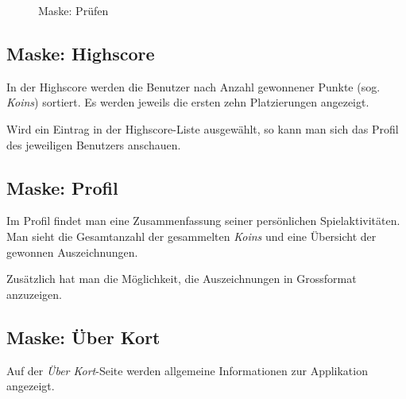 \begin{figure}[H]
\hfill
{}
\caption{Maske: Prüfen}
\end{figure}

\subsection{Maske: Highscore}
In der Highscore werden die Benutzer nach Anzahl gewonnener Punkte (sog. \emph{Koins}) sortiert.
Es werden jeweils die ersten zehn Platzierungen angezeigt.

Wird ein Eintrag in der Highscore-Liste ausgewählt, so kann man sich das Profil des jeweiligen Benutzers anschauen.

\subsection{Maske: Profil}
Im Profil findet man eine Zusammenfassung seiner persönlichen Spielaktivitäten.
Man sieht die Gesamtanzahl der gesammelten \emph{Koins} und eine Übersicht der gewonnen Auszeichnungen.

Zusätzlich hat man die Möglichkeit, die Auszeichnungen in Grossformat anzuzeigen.

\subsection{Maske: Über Kort}
Auf der \emph{Über Kort}-Seite werden allgemeine Informationen zur Applikation angezeigt.


